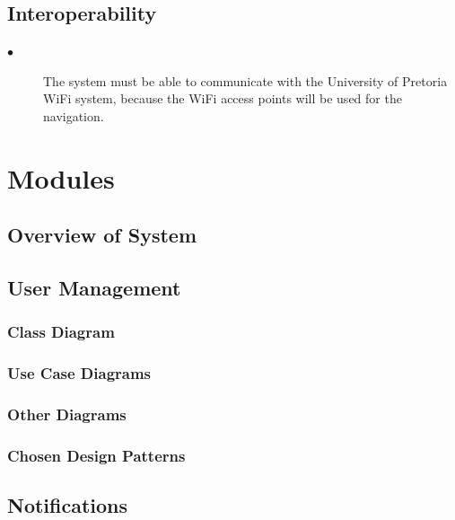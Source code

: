 \documentclass{article}
\begin{document}
    \subsection{Interoperability}
    
        \begin{description}
        
        \item[$\bullet$]The system must be able to communicate with the University of Pretoria WiFi system, because the WiFi  access points will be used for the navigation.
        
        \end{description}

\section{Modules}
	
	\subsection{Overview of System}
	
    \subsection{User Management}
        \subsubsection{Class Diagram}
        \subsubsection{Use Case Diagrams}
        \subsubsection{Other Diagrams}
        \subsubsection{Chosen Design Patterns}
    \subsection{Notifications}
\end{document}
